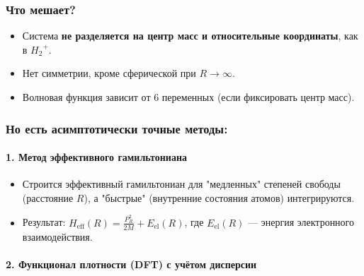 \documentclass[11pt]{article}
\providecommand{\tightlist}{%
      \setlength{\itemsep}{0pt}\setlength{\parskip}{0pt}}
\begin{document}
\subsubsection{Что
мешает?}\label{ux447ux442ux43e-ux43cux435ux448ux430ux435ux442}

\begin{itemize}
\tightlist
\item
  Система \textbf{не разделяется на центр масс и относительные
  координаты}, как в \({H_2}^{+}\).
\item
  Нет симметрии, кроме сферической при \(R \to \infty\).
\item
  Волновая функция зависит от 6 переменных (если фиксировать центр
  масс).
\end{itemize}

\subsubsection{\texorpdfstring{Но есть \textbf{асимптотически точные
методы}:}{Но есть асимптотически точные методы:}}\label{ux43dux43e-ux435ux441ux442ux44c-ux430ux441ux438ux43cux43fux442ux43eux442ux438ux447ux435ux441ux43aux438-ux442ux43eux447ux43dux44bux435-ux43cux435ux442ux43eux434ux44b}

\paragraph{\texorpdfstring{1. \textbf{Метод эффективного
гамильтониана}}{1. Метод эффективного гамильтониана}}\label{ux43cux435ux442ux43eux434-ux44dux444ux444ux435ux43aux442ux438ux432ux43dux43eux433ux43e-ux433ux430ux43cux438ux43bux44cux442ux43eux43dux438ux430ux43dux430}

\begin{itemize}
\tightlist
\item
  Строится эффективный гамильтониан для "медленных" степеней свободы
  (расстояние \(R\)), а "быстрые" (внутренние состояния атомов)
  интегрируются.
\item
  Результат:
  \(H_{\text{eff}}(R) = \frac{P_R^2}{2M} + E_{\text{el}}(R)\), где
  \(E_{\text{el}}(R)\) --- энергия электронного взаимодействия.
\end{itemize}

\paragraph{\texorpdfstring{2. \textbf{Функционал плотности (DFT) с
учётом
дисперсии}}{2. Функционал плотности (DFT) с учётом дисперсии}}\label{ux444ux443ux43dux43aux446ux438ux43eux43dux430ux43b-ux43fux43bux43eux442ux43dux43eux441ux442ux438-dft-ux441-ux443ux447ux451ux442ux43eux43c-ux434ux438ux441ux43fux435ux440ux441ux438ux438}
\end{document}
